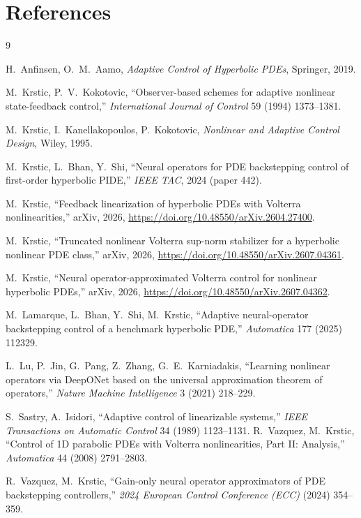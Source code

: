 \documentclass[journal,twoside,web]{ieeecolor}
\begin{document}
\section*{References}
\vspace{-1.5em}
\begin{thebibliography}{9}


 H.\ Anfinsen, O.\ M.\ Aamo, \emph{Adaptive Control of Hyperbolic PDEs}, Springer, 2019.


 M.\ Krstic, P.\ V.\ Kokotovic, ``Observer-based schemes for adaptive nonlinear state-feedback control,'' \emph{International Journal of Control} 59 (1994) 1373--1381.

 M.\ Krstic, I.\ Kanellakopoulos, P.\ Kokotovic, \emph{Nonlinear and Adaptive Control Design}, Wiley, 1995.

 M.\ Krstic, L.\ Bhan, Y.\ Shi, ``Neural operators for PDE backstepping control of first-order hyperbolic PIDE,'' \emph{IEEE TAC}, 2024 (paper 442).

 M.\ Krstic, ``Feedback linearization of hyperbolic PDEs with Volterra nonlinearities,'' arXiv, 2026, \url{https://doi.org/10.48550/arXiv.2604.27400}.

 M.\ Krstic, ``Truncated nonlinear Volterra sup-norm stabilizer for a hyperbolic nonlinear PDE class,'' arXiv, 2026, \url{https://doi.org/10.48550/arXiv.2607.04361}.

 M.\ Krstic, ``Neural operator-approximated Volterra control for nonlinear hyperbolic PDEs,'' arXiv, 2026, \url{https://doi.org/10.48550/arXiv.2607.04362}.

 M.\ Lamarque, L.\ Bhan, Y.\ Shi, M.\ Krstic, ``Adaptive neural-operator backstepping control of a benchmark hyperbolic PDE,'' \emph{Automatica} 177 (2025) 112329.

 L.\ Lu, P.\ Jin, G.\ Pang, Z.\ Zhang, G.\ E.\ Karniadakis, ``Learning nonlinear operators via DeepONet based on the universal approximation theorem of operators,'' \emph{Nature Machine Intelligence} 3 (2021) 218--229.

 S.\ Sastry, A.\ Isidori, ``Adaptive control of linearizable systems,'' \emph{IEEE Transactions on Automatic Control} 34 (1989) 1123--1131.
 R.\ Vazquez, M.\ Krstic, ``Control of 1D parabolic PDEs with Volterra nonlinearities, Part II: Analysis,'' \emph{Automatica} 44 (2008) 2791--2803.

 R.\ Vazquez, M.\ Krstic, ``Gain-only neural operator approximators of PDE backstepping controllers,'' \emph{2024 European Control Conference (ECC)} (2024) 354--359.

\end{thebibliography}
\end{document}
